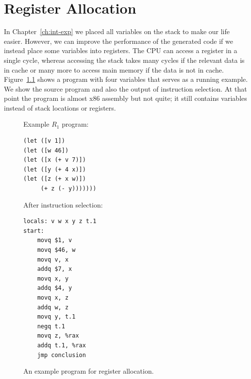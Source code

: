 \documentclass[11pt]{book}
\begin{document}
\chapter{Register Allocation}
\label{ch:register-allocation-r1}

In Chapter~\ref{ch:int-exp} we placed all variables on the stack to
make our life easier. However, we can improve the performance of the
generated code if we instead place some variables into registers.  The
CPU can access a register in a single cycle, whereas accessing the
stack takes many cycles if the relevant data is in cache or many more
to access main memory if the data is not in cache.
Figure~\ref{fig:reg-eg} shows a program with four variables that
serves as a running example. We show the source program and also the
output of instruction selection. At that point the program is almost
x86 assembly but not quite; it still contains variables instead of
stack locations or registers.

\begin{figure}
\begin{minipage}{0.45\textwidth}
Example $R_1$ program:
\begin{lstlisting}
(let ([v 1])
(let ([w 46])
(let ([x (+ v 7)])
(let ([y (+ 4 x)])
(let ([z (+ x w)])
     (+ z (- y)))))))
\end{lstlisting}
\end{minipage}
\begin{minipage}{0.45\textwidth}
After instruction selection:
\begin{lstlisting}
locals: v w x y z t.1
start:
    movq $1, v
    movq $46, w
    movq v, x
    addq $7, x
    movq x, y
    addq $4, y
    movq x, z
    addq w, z
    movq y, t.1
    negq t.1
    movq z, %rax
    addq t.1, %rax
    jmp conclusion
\end{lstlisting}
\end{minipage}
\caption{An example program for register allocation.}
\label{fig:reg-eg}
\end{figure}
\end{document}
